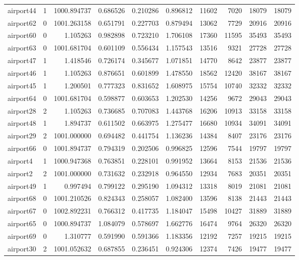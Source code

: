 \begin{longtable}{|l|r|r|r|r|r|r|r|r|r|}
airport44 & 1 & 1000.894737 & 0.686526 & 0.210286 & 0.896812 & 11602 & 7020 & 18079 & 18079 \\
airport62 & 0 & 1001.263158 & 0.651791 & 0.227703 & 0.879494 & 13062 & 7729 & 20916 & 20916 \\
airport60 & 0 & 1.105263 & 0.982898 & 0.723210 & 1.706108 & 17360 & 11595 & 35493 & 35493 \\
airport63 & 0 & 1001.681704 & 0.601109 & 0.556434 & 1.157543 & 13516 & 9321 & 27728 & 27728 \\
airport47 & 1 & 1.418546 & 0.726174 & 0.345677 & 1.071851 & 14770 & 8642 & 23877 & 23877 \\
airport46 & 1 & 1.105263 & 0.876651 & 0.601899 & 1.478550 & 18562 & 12420 & 38167 & 38167 \\
airport45 & 1 & 1.200501 & 0.777323 & 0.831652 & 1.608975 & 15754 & 10740 & 32332 & 32332 \\
airport64 & 0 & 1001.681704 & 0.598877 & 0.603653 & 1.202530 & 14256 & 9672 & 29043 & 29043 \\
airport28 & 2 & 1.105263 & 0.736685 & 0.707083 & 1.443768 & 16206 & 10913 & 33158 & 33158 \\
airport48 & 1 & 1.894737 & 0.611502 & 0.663975 & 1.275477 & 16680 & 10934 & 34091 & 34091 \\
airport29 & 2 & 1001.000000 & 0.694482 & 0.441754 & 1.136236 & 14384 & 8407 & 23176 & 23176 \\
airport66 & 0 & 1001.894737 & 0.794319 & 0.202506 & 0.996825 & 12596 & 7544 & 19797 & 19797 \\
airport4 & 1 & 1000.947368 & 0.763851 & 0.228101 & 0.991952 & 13664 & 8153 & 21536 & 21536 \\
airport2 & 2 & 1001.000000 & 0.731632 & 0.232918 & 0.964550 & 12934 & 7683 & 20351 & 20351 \\
airport49 & 1 & 0.997494 & 0.799122 & 0.295190 & 1.094312 & 13318 & 8019 & 21081 & 21081 \\
airport68 & 0 & 1001.210526 & 0.824343 & 0.258057 & 1.082400 & 13596 & 8138 & 21443 & 21443 \\
airport67 & 0 & 1002.892231 & 0.766312 & 0.417735 & 1.184047 & 15498 & 10427 & 31889 & 31889 \\
airport65 & 0 & 1000.894737 & 1.084079 & 0.578697 & 1.662776 & 16474 & 9764 & 26320 & 26320 \\
airport69 & 0 & 1.310777 & 0.591990 & 0.591366 & 1.183356 & 12192 & 7257 & 19215 & 19215 \\
airport30 & 2 & 1001.052632 & 0.687855 & 0.236451 & 0.924306 & 12374 & 7426 & 19477 & 19477 \\

\end{longtable}
